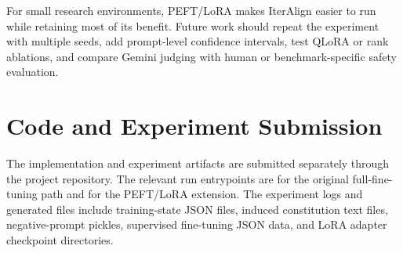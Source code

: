 \documentclass[10pt,twocolumn]{article}
\begin{document}
For small research environments, PEFT/LoRA makes IterAlign easier to run while retaining most of its benefit. Future work should repeat the experiment with multiple seeds, add prompt-level confidence intervals, test QLoRA or rank ablations, and compare Gemini judging with human or benchmark-specific safety evaluation.

\section*{Code and Experiment Submission}
\label{sec:code}

The implementation and experiment artifacts are submitted separately through the project repository. The relevant run entrypoints are  for the original full-fine-tuning path and  for the PEFT/LoRA extension. The experiment logs and generated files include training-state JSON files, induced constitution text files, negative-prompt pickles, supervised fine-tuning JSON data, and LoRA adapter checkpoint directories.



\end{document}
